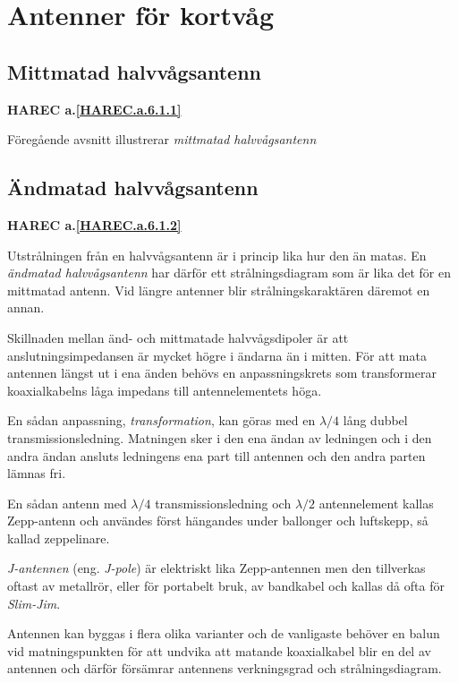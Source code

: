 \section{Antenner för kortvåg}

\subsection{Mittmatad halvvågsantenn}
\textbf{
HAREC a.\ref{HAREC.a.6.1.1}\label{myHAREC.a.6.1.1}
}

Föregående avsnitt illustrerar \emph{mittmatad halvvågsantenn}

\subsection{Ändmatad halvvågsantenn}
\textbf{
HAREC a.\ref{HAREC.a.6.1.2}\label{myHAREC.a.6.1.2}
}

Utstrålningen från en halvvågsantenn är i princip lika hur den än matas.
En \emph{ändmatad halvvågsantenn} har därför ett strålningsdiagram som är lika
det för en mittmatad antenn.
Vid längre antenner blir strålningskaraktären däremot en annan.

Skillnaden mellan änd- och mittmatade halvvågsdipoler är att
anslutningsimpedansen är mycket högre i ändarna än i mitten.
För att mata antennen längst ut i ena änden behövs en anpassningskrets som
transformerar koaxialkabelns låga impedans till antennelementets höga.

En sådan anpassning, \emph{transformation}, kan göras med en \(\lambda/4\) lång
dubbel transmissionsledning.
Matningen sker i den ena ändan av ledningen och i den andra ändan ansluts
ledningens ena part till antennen och den andra parten lämnas fri.

En sådan antenn med \(\lambda/4\) transmissionsledning och \(\lambda/2\)
antennelement kallas Zepp-antenn och användes först hängandes under ballonger
och luftskepp, så kallad zeppelinare.

\emph{J-antennen} (eng. \emph{J-pole}) \cite[J-antenne]{Rothammel2001} är
elektriskt lika Zepp-antennen men den tillverkas oftast av metallrör, eller
för portabelt bruk, av bandkabel och kallas då ofta för \emph{Slim-Jim}.

Antennen kan byggas i flera olika varianter och de vanligaste behöver en balun
vid matningspunkten för att undvika att matande koaxialkabel blir en del av
antennen och därför försämrar antennens verkningsgrad och strålningsdiagram.

